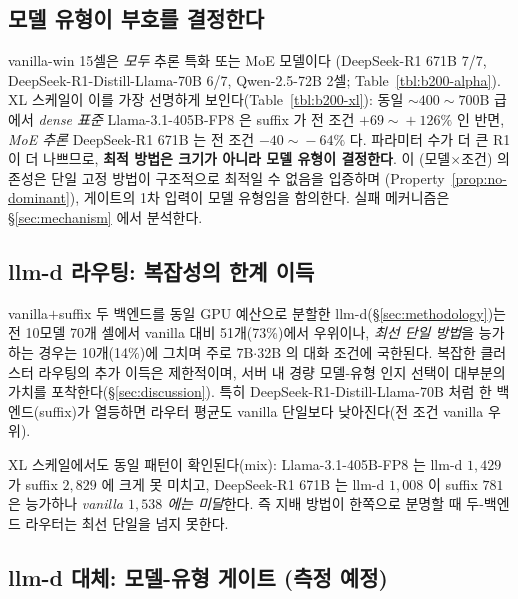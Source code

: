 \subsection{모델 유형이 부호를 결정한다}
\label{subsec:res-modeltype}



vanilla-win 15셀은 \emph{모두} 추론 특화 또는 MoE 모델이다
(DeepSeek-R1 671B 7/7, DeepSeek-R1-Distill-Llama-70B 6/7, Qwen-2.5-72B 2셀; Table~\ref{tbl:b200-alpha}).
XL 스케일이 이를 가장 선명하게 보인다(Table~\ref{tbl:b200-xl}):
동일 $\sim\!400\!\sim\!700$B 급에서 \emph{dense 표준} Llama-3.1-405B-FP8 은 suffix 가
전 조건 $+69\!\sim\!+126\%$ 인 반면, \emph{MoE 추론} DeepSeek-R1 671B 는
전 조건 $-40\!\sim\!-64\%$ 다.
파라미터 수가 더 큰 R1 이 더 나쁘므로, \textbf{최적 방법은 크기가 아니라 모델 유형이 결정한다}.
이 (모델$\times$조건) 의존성은 단일 고정 방법이 구조적으로 최적일 수 없음을 입증하며
(Property~\ref{prop:no-dominant}), 게이트의 1차 입력이 모델 유형임을 함의한다.
실패 메커니즘은 \S\ref{sec:mechanism} 에서 분석한다.

\subsection{llm-d 라우팅: 복잡성의 한계 이득}
\label{subsec:res-llmd}

vanilla$+$suffix 두 백엔드를 동일 GPU 예산으로 분할한 llm-d(\S\ref{sec:methodology})는
전 10모델 70개 셀에서 vanilla 대비 51개(73\%)에서 우위이나,
\emph{최선 단일 방법}을 능가하는 경우는 10개(14\%)에 그치며
주로 7B$\cdot$32B 의 대화 조건에 국한된다.
복잡한 클러스터 라우팅의 추가 이득은 제한적이며,
서버 내 경량 모델-유형 인지 선택이 대부분의 가치를 포착한다(\S\ref{sec:discussion}).
특히 DeepSeek-R1-Distill-Llama-70B 처럼 한 백엔드(suffix)가 열등하면
라우터 평균도 vanilla 단일보다 낮아진다(전 조건 vanilla 우위).

XL 스케일에서도 동일 패턴이 확인된다(mix): Llama-3.1-405B-FP8 는 llm-d $1{,}429$ 가
suffix $2{,}829$ 에 크게 못 미치고, DeepSeek-R1 671B 는 llm-d $1{,}008$ 이
suffix $781$ 은 능가하나 \emph{vanilla $1{,}538$ 에는 미달}한다.
즉 지배 방법이 한쪽으로 분명할 때 두-백엔드 라우터는 최선 단일을 넘지 못한다.

\subsection{llm-d 대체: 모델-유형 게이트 (측정 예정)}
\label{subsec:res-gate}

